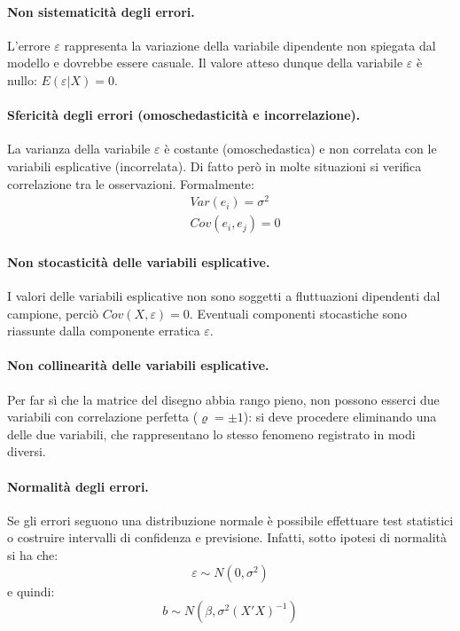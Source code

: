 \documentclass[11pt]{article}
\begin{document}
\paragraph{Non sistematicità degli errori.}
L'errore $\varepsilon$ rappresenta la variazione della variabile dipendente non spiegata dal modello e dovrebbe essere casuale.
Il valore atteso dunque della variabile $\varepsilon$ è nullo: $E(\varepsilon|X) = 0$.

\paragraph{Sfericità degli errori (omoschedasticità e incorrelazione).}
La varianza della variabile $\varepsilon$ è costante (omoschedastica) e non correlata con le variabili esplicative (incorrelata).
Di fatto però in molte situazioni si verifica correlazione tra le osservazioni.
Formalmente:
\begin{align*}
  &Var(e_i) = \sigma^2 \\
  &Cov(e_i, e_j) = 0
\end{align*}

\paragraph{Non stocasticità delle variabili esplicative.}
I valori delle variabili esplicative non sono soggetti a fluttuazioni dipendenti dal campione, perciò $Cov(X,\varepsilon) = 0$.
Eventuali componenti stocastiche sono riassunte dalla componente erratica $\varepsilon$.

\paragraph{Non collinearità delle variabili esplicative.}
Per far sì che la matrice del disegno abbia rango pieno, non possono esserci due variabili con correlazione perfetta ($\varrho = \pm1$): si deve procedere eliminando una delle due variabili, che rappresentano lo stesso fenomeno registrato in modi diversi.

\paragraph{Normalità degli errori.}
Se gli errori seguono una distribuzione normale è possibile effettuare test statistici o costruire intervalli di confidenza e previsione.
Infatti, sotto ipotesi di normalità si ha che:
\begin{equation*}
  \varepsilon \sim N(0, \sigma^2)
\end{equation*}
e quindi:
\begin{equation*}
  b \sim N(\beta, \sigma^2(X'X)^{-1})
\end{equation*}
\end{document}
